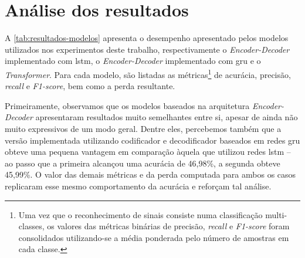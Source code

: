 \section{Análise dos resultados}
\label{sec:avaliacao-resultados}

A \autoref{tab:resultados-modelos} apresenta o desempenho apresentado pelos modelos utilizados nos experimentos deste trabalho, respectivamente o \textit{Encoder-Decoder} implementado com \acrshort{lstm}, o \textit{Encoder-Decoder} implementado com \acrshort{gru} e o \textit{Transformer}.
Para cada modelo, são listadas as métricas\footnote{
    Uma vez que o reconhecimento de sinais consiste numa classificação multi-classes, os valores das métricas binárias de precisão, \textit{recall} e \textit{F1-score} foram consolidados utilizando-se a média ponderada pelo número de amostras em cada classe.
} de acurácia, precisão, \textit{recall} e \textit{F1-score}, bem como a perda resultante.





Primeiramente, observamos que os modelos baseados na arquitetura \textit{Encoder-Decoder} apresentaram resultados muito semelhantes entre si, apesar de ainda não muito expressivos de um modo geral.
Dentre eles, percebemos também que a versão implementada utilizando codificador e decodificador baseados em redes \acrshort{gru} obteve uma pequena vantagem em comparação àquela que utilizou redes \acrshort{lstm} -- ao passo que a primeira alcançou uma acurácia de 46,98\%, a segunda obteve 45,99\%.
O valor das demais métricas e da perda computada para ambos os casos replicaram esse mesmo comportamento da acurácia e reforçam tal análise.

